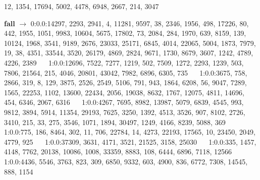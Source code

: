 \documentclass[a4paper,11pt,oneside]{book}
\begin{document}
12, 1354, 17694, 5002, 4478, 6948, 2667, 214, 3047	$\quad$	

\textbf{fall} $\rightarrow$	0:0.0:14297, 2293, 2941, 4, 11281, 9597, 38, 2346, 1956, 498, 17226, 80, 442, 1955, 1051, 9983, 10604, 5675, 17802, 73, 2084, 284, 1970, 639, 8159, 139, 10124, 1968, 3541, 9189, 2676, 23033, 25171, 6845, 4014, 22065, 5004, 1873, 7979, 19, 38, 4351, 33544, 3520, 26179, 4869, 2824, 9671, 1730, 8679, 3607, 1242, 4789, 4226, 2389	$\quad$	1:0.0:12696, 7522, 7277, 1219, 502, 7509, 1272, 2293, 1239, 503, 7806, 21564, 215, 4046, 20801, 43042, 7982, 6896, 6305, 735	$\quad$	1:0.0:3675, 758, 2866, 319, 8, 129, 3875, 2526, 2549, 5106, 791, 943, 1864, 6208, 56, 9047, 7289, 1565, 22253, 1102, 13600, 22434, 2056, 19038, 8632, 1767, 12075, 4811, 14696, 454, 6346, 2067, 6316	$\quad$	1:0.0:4267, 7695, 8982, 13987, 5079, 6839, 4545, 993, 9812, 3894, 5914, 11354, 29193, 7625, 3250, 1392, 4513, 3526, 907, 8102, 2726, 3410, 215, 33, 275, 3546, 1071, 1894, 30497, 1249, 4166, 8239, 5088, 369	$\quad$	1:0.0:775, 186, 8464, 302, 11, 706, 22784, 14, 4273, 22193, 17565, 10, 23450, 2049, 4779, 925	$\quad$	1:0.0:37309, 3631, 4171, 3521, 21525, 3158, 25030	$\quad$	1:0.0:335, 1457, 4148, 7762, 20138, 10086, 1008, 33359, 8883, 108, 6444, 6896, 7118, 12566	$\quad$	1:0.0:4436, 5546, 3763, 823, 309, 6850, 9332, 603, 4900, 836, 6772, 7308, 14545, 888, 1154	$\quad$	
\end{document}
